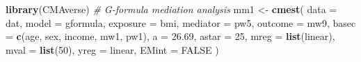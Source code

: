 \documentclass[
]{book}
\newenvironment{Shaded}{\begin{snugshade}}{\end{snugshade}}
\newcommand{\AttributeTok}[1]{\textcolor[rgb]{0.13,0.29,0.53}{#1}}
\newcommand{\CommentTok}[1]{\textcolor[rgb]{0.56,0.35,0.01}{\textit{#1}}}
\newcommand{\ConstantTok}[1]{\textcolor[rgb]{0.56,0.35,0.01}{#1}}
\newcommand{\DecValTok}[1]{\textcolor[rgb]{0.00,0.00,0.81}{#1}}
\newcommand{\FloatTok}[1]{\textcolor[rgb]{0.00,0.00,0.81}{#1}}
\newcommand{\FunctionTok}[1]{\textcolor[rgb]{0.13,0.29,0.53}{\textbf{#1}}}
\newcommand{\NormalTok}[1]{#1}
\newcommand{\OtherTok}[1]{\textcolor[rgb]{0.56,0.35,0.01}{#1}}
\newcommand{\StringTok}[1]{\textcolor[rgb]{0.31,0.60,0.02}{#1}}
\begin{document}
\begin{Shaded}
\begin{Highlighting}[]
\FunctionTok{library}\NormalTok{(CMAverse)}
\CommentTok{\# G{-}formula mediation analysis}
\NormalTok{mm1 }\OtherTok{\textless{}{-}} \FunctionTok{cmest}\NormalTok{(}
  \AttributeTok{data =}\NormalTok{ dat, }
  \AttributeTok{model =} \StringTok{\textquotesingle{}gformula\textquotesingle{}}\NormalTok{, }
  \AttributeTok{exposure =} \StringTok{\textquotesingle{}bmi\textquotesingle{}}\NormalTok{, }
  \AttributeTok{mediator =} \StringTok{\textquotesingle{}pw5\textquotesingle{}}\NormalTok{, }
  \AttributeTok{outcome =} \StringTok{\textquotesingle{}mw9\textquotesingle{}}\NormalTok{, }
  \AttributeTok{basec =} \FunctionTok{c}\NormalTok{(}\StringTok{\textquotesingle{}age\textquotesingle{}}\NormalTok{, }\StringTok{\textquotesingle{}sex\textquotesingle{}}\NormalTok{, }\StringTok{\textquotesingle{}income\textquotesingle{}}\NormalTok{, }\StringTok{\textquotesingle{}mw1\textquotesingle{}}\NormalTok{, }\StringTok{\textquotesingle{}pw1\textquotesingle{}}\NormalTok{), }
  \AttributeTok{a =} \FloatTok{26.69}\NormalTok{, }
  \AttributeTok{astar =} \DecValTok{25}\NormalTok{, }
  \AttributeTok{mreg =} \FunctionTok{list}\NormalTok{(}\StringTok{\textquotesingle{}linear\textquotesingle{}}\NormalTok{), }
  \AttributeTok{mval =} \FunctionTok{list}\NormalTok{(}\DecValTok{50}\NormalTok{), }
  \AttributeTok{yreg =} \StringTok{\textquotesingle{}linear\textquotesingle{}}\NormalTok{, }
  \AttributeTok{EMint =} \ConstantTok{FALSE}
\NormalTok{) }
\end{Highlighting}
\end{Shaded}
\end{document}
